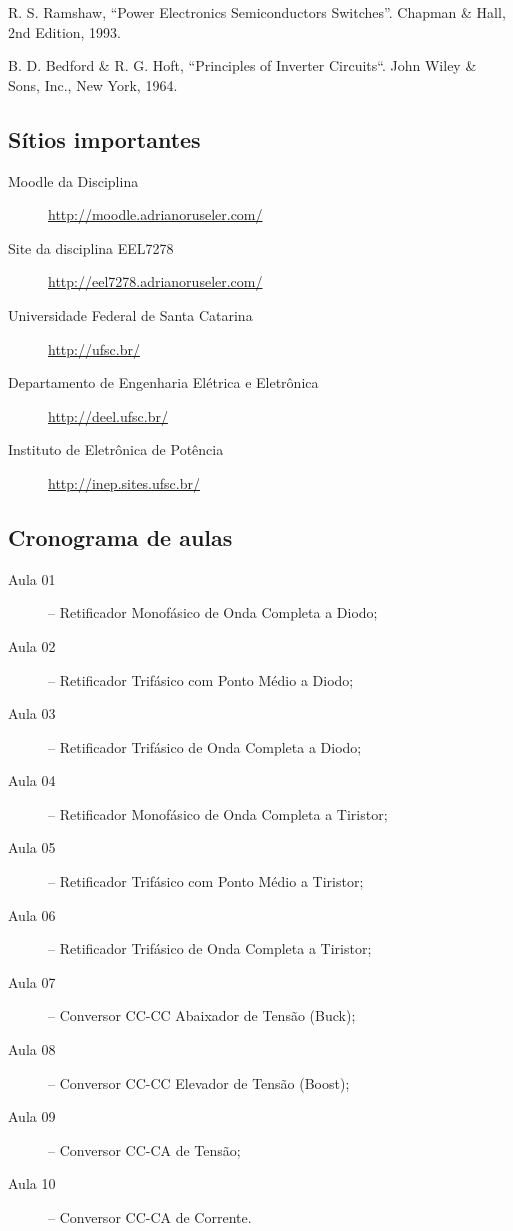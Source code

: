 \documentclass[
	article,			%
	12pt,				%
	twoside,			%
	a4paper,			%
	english,			%
	brazil,				%
	sumario=tradicional
]{abntex2-modelo-plano-de-aula}
\begin{document}
R. S. Ramshaw, “Power Electronics Semiconductors Switches”. Chapman \&
Hall, 2nd Edition, 1993.

B. D. Bedford \& R. G. Hoft, “Principles of Inverter Circuits“. John Wiley \& Sons,
Inc., New York, 1964.

\hspace{1cm}
\newpage
\begin{mdframed}[style=mdfexample2]	\center
	\section{Sítios importantes}
\end{mdframed}

\begin{description}
	\item[Moodle da Disciplina] \url{http://moodle.adrianoruseler.com/}
	\item[Site da disciplina EEL7278] \url{http://eel7278.adrianoruseler.com/}
	\item[Universidade Federal de Santa Catarina] \url{http://ufsc.br/}
	\item[Departamento de Engenharia Elétrica e Eletrônica] \url{http://deel.ufsc.br/}
	\item[Instituto de Eletrônica de Potência] \url{http://inep.sites.ufsc.br/}
\end{description}




\begin{mdframed}[style=mdfexample2]	\center
	\section{Cronograma de aulas}
\end{mdframed}

\begin{description}
	\item[Aula 01] – Retificador Monofásico de Onda Completa a Diodo;
	\item[Aula 02] – Retificador Trifásico com Ponto Médio a Diodo;
	\item[Aula 03] – Retificador Trifásico de Onda Completa a Diodo;
	\item[Aula 04] – Retificador Monofásico de Onda Completa a Tiristor;
	\item[Aula 05] – Retificador Trifásico com Ponto Médio a Tiristor;
	\item[Aula 06] – Retificador Trifásico de Onda Completa a Tiristor;
	\item[Aula 07] – Conversor CC-CC Abaixador de Tensão (Buck);
	\item[Aula 08] – Conversor CC-CC Elevador de Tensão (Boost);
	\item[Aula 09] – Conversor CC-CA de Tensão;
	\item[Aula 10] – Conversor CC-CA de Corrente.
	
\end{description}
\end{document}
